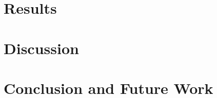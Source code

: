 \lipsum[1-4]

\chapter{Results}
\label{ch:results}

\lipsum[1-4]

\chapter{Discussion}
\label{ch:discussion}

\lipsum[1-4]

\chapter{Conclusion and Future Work}
\label{ch:conclusion}

\lipsum[1-4]

\listoffigures
 
\listoftables




